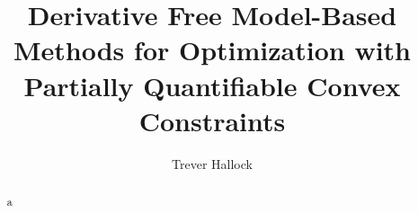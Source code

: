 \documentclass{article}
\title{Derivative Free Model-Based Methods for Optimization with Partially Quantifiable Convex Constraints}
\author{Trever Hallock}
\begin{document}
\maketitle

\begin{abstract}
a
\end{abstract}

\newpage

\tableofcontents

\newpage






\end{document}
